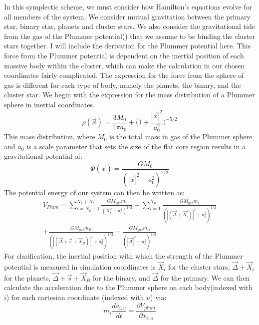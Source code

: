 \documentclass[manuscript]{aastex631}
\begin{document}
In this symplectic scheme, we must consider how Hamilton's equations evolve for all members of the system. We consider mutual gravitation
between the primary star, binary star, planets and cluster stars. We also consider the gravitational tide from the gas of the 
Plummer potential(\cite{plu11}) that we assume to be binding the cluster stars together. I will include the derivation for the Plummer potential here.
This force from the Plummer potential is dependent on the inertial position of each massive body within the cluster, which can make the 
calculation in our chosen coordinates fairly complicated. The expression for the force from the sphere of gas is different for each type of body,
namely the planets, the binary, and the cluster star. We begin with the expression for the mass distribution of a Plummer sphere in inertial coordinates. 
\begin{equation}
\rho (\vec{x}) = \frac{3M_0}{4\pi a_0}+\biggl(1+\frac{|\vec{x}|^2}{a_0^2} \biggr)^{-5/2}
\end{equation}
This mass distribution, where $M_0$ is the total mass in gas of the Plummer sphere and $a_0$ is a scale parameter that sets the size of the flat core region results
in a gravitational potential of:
\begin{equation}
    \Phi(\vec{x}) = \frac{GM_0}{(|\vec{x}|^2+a_0^2)^{1/2}}
\end{equation} 
The potential energy of our system can then be written as:
\begin{equation}
    \begin{split}
        V_{Plum} = \sum_{i=N_p+1}^{N_p+N_s}\frac{GM_{gas}m_i}{(X_i^2+a_0^2)^{1/2}} + 
        \sum_{i=1}^{N_p}\frac{GM_{gas}m_i}{(|(\vec{\Delta}+ \vec{X_i})|^2+a_0^2)^{1/2}} \\ 
        +\frac{GM_{gas}m_B}{(|(\vec{\Delta} + \vec{s} + \vec{X}_B)|^2+a_0^2)^{1/2}} 
        + \frac{GM_{gas}m_A}{(|\vec{\Delta}|^2+a_0^2)^{1/2}} 
    \end{split}
\end{equation}
For clarification, the inertial position with which the strength of the Plummer potential is measured in simulation coordinates is $\vec{X}_i$ for the cluster stars,
$\vec{\Delta}+\vec{X}_i$ for the planets, $\vec{\Delta}+\vec{s}+\vec{X}_B$ for the binary, and $\vec{\Delta}$ for the primary.
We can then calculate the acceleration due to the Plummer sphere on each body(indexed with $i$) for each cartesian coordinate (indexed with $u$) via:
\begin{equation}
    m_i\frac{dv_{i,u}}{dt} = \frac{\partial V_{plum}}{\partial x_{i,u}}
\end{equation}
\end{document}
